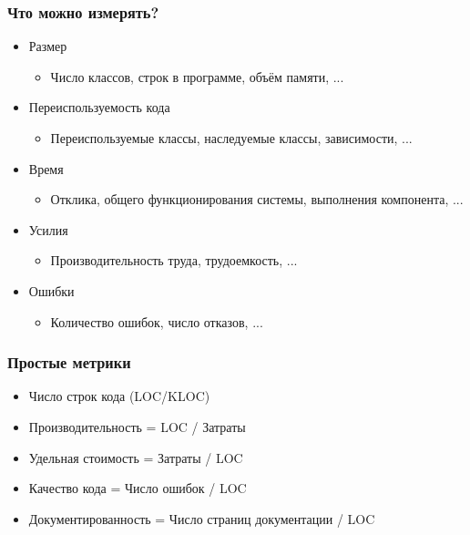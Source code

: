 \documentclass{../../slides-style}
\begin{document}
    \begin{frame}
        \frametitle{Что можно измерять?}
        \begin{itemize}
            \item Размер
            \begin{itemize}
                \item Число классов, строк в программе, объём памяти, ...
            \end{itemize}
            \item Переиспользуемость кода
            \begin{itemize}
                \item Переиспользуемые классы, наследуемые классы, зависимости, ...
            \end{itemize}
            \item Время
            \begin{itemize}
                \item Отклика, общего функционирования системы, выполнения компонента, ...
            \end{itemize}
            \item Усилия
            \begin{itemize}
                \item Производительность труда, трудоемкость, ...
            \end{itemize}
            \item Ошибки
            \begin{itemize}
                \item Количество ошибок, число отказов, ...
            \end{itemize}
        \end{itemize}
    \end{frame}

    \begin{frame}
        \frametitle{Простые метрики}
        \begin{itemize}
            \item Число строк кода (LOC/KLOC)
            \item Производительность = LOC / Затраты
            \item Удельная стоимость = Затраты / LOC
            \item Качество кода = Число ошибок / LOC
            \item Документированность = Число страниц документации / LOC
        \end{itemize}
    \end{frame}
\end{document}
